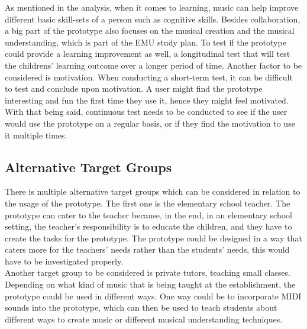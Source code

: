 As mentioned in the analysis, when it comes to learning, music can help improve different basic skill-sets of a person such as cognitive skills. Besides collaboration, a big part of the prototype also focuses on the musical creation and the musical understanding, which is part of the EMU study plan\cite{studyPlan}. To test if the prototype could provide a learning improvement as well, a longitudinal test that will test the childrens' learning outcome over a longer period of time. Another factor to be considered is motivation. When conducting a short-term test, it can be difficult to test and conclude upon motivation. A user might find the prototype interesting and fun the first time they use it, hence they might feel motivated. With that being said, continuous test needs to be conducted to see if the user would use the prototype on a regular basis, or if they find the motivation to use it multiple times.

\subsection{Alternative Target Groups}
There is multiple alternative target groups which can be considered in relation to the usage of the prototype. The first one is the elementary school teacher. The prototype can cater to the teacher because, in the end, in an elementary school setting, the teacher's responsibility is to educate the children, and they have to create the tasks for the prototype. The prototype could be designed in a way that caters more for the teachers' needs rather than the students' needs, this would have to be investigated properly.\\

Another target group to be considered is private tutors, teaching small classes. Depending on what kind of music that is being taught at the establishment, the prototype could be used in different ways. One way could be to incorporate MIDI sounds into the prototype, which can then be used to teach students about different ways to create music  or different musical understanding techniques.